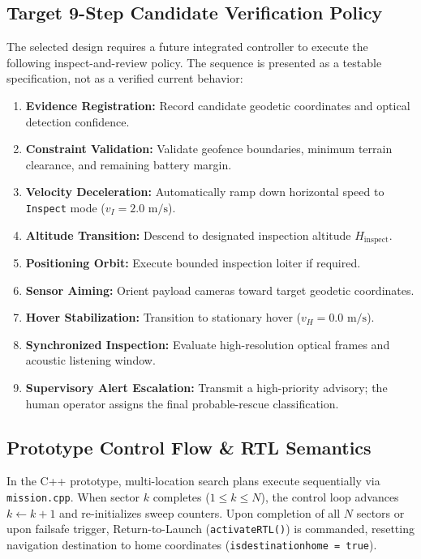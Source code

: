 \subsection{Target 9-Step Candidate Verification Policy}
The selected design requires a future integrated controller to execute the following inspect-and-review policy. The sequence is presented as a testable specification, not as a verified current behavior:
\begin{enumerate}
    \item \textbf{Evidence Registration:} Record candidate geodetic coordinates and optical detection confidence.
    \item \textbf{Constraint Validation:} Validate geofence boundaries, minimum terrain clearance, and remaining battery margin.
    \item \textbf{Velocity Deceleration:} Automatically ramp down horizontal speed to \texttt{Inspect} mode ($v_I = 2.0\text{ m/s}$).
    \item \textbf{Altitude Transition:} Descend to designated inspection altitude $H_{\mathrm{inspect}}$.
    \item \textbf{Positioning Orbit:} Execute bounded inspection loiter if required.
    \item \textbf{Sensor Aiming:} Orient payload cameras toward target geodetic coordinates.
    \item \textbf{Hover Stabilization:} Transition to stationary hover ($v_H = 0.0\text{ m/s}$).
    \item \textbf{Synchronized Inspection:} Evaluate high-resolution optical frames and acoustic listening window.
    \item \textbf{Supervisory Alert Escalation:} Transmit a high-priority advisory; the human operator assigns the final probable-rescue classification.
\end{enumerate}

\subsection{Prototype Control Flow \& RTL Semantics}
In the C++ prototype, multi-location search plans execute sequentially via \texttt{mission.cpp}. When sector $k$ completes ($1 \le k \le N$), the control loop advances $k \leftarrow k+1$ and re-initializes sweep counters. Upon completion of all $N$ sectors or upon failsafe trigger, Return-to-Launch (\texttt{activateRTL()}) is commanded, resetting navigation destination to home coordinates (\texttt{isdestinationhome = true}).
